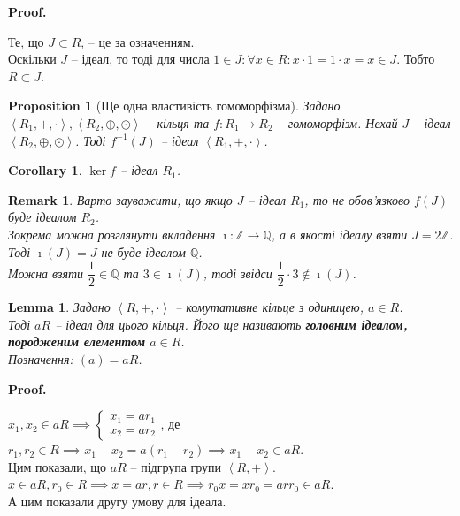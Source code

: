 \documentclass[a4paper, 10pt]{article}
\makeatletter
\theoremstyle{theoremdd}
\theoremstyle{theoremdd}
\theoremstyle{theoremdd}
\theoremstyle{theoremdd}
\theoremstyle{theoremdd}
\theoremstyle{theoremdd}
\theoremstyle{theoremdd}
\theoremstyle{theoremdd}
\theoremstyle{theoremdd}
\newtheorem{proposition}[theorem]{Proposition}
\theoremstyle{theoremdd}
\theoremstyle{theoremdd}
\newtheorem{remark}[theorem]{Remark}
\theoremstyle{theoremdd}
\theoremstyle{theoremdd}
\newtheorem{lemma}[theorem]{Lemma}
\theoremstyle{theoremdd}
\newtheorem{corollary}[theorem]{Corollary}
\theoremstyle{theoremdd}
\renewenvironment{proof}[1][Proof.\\]{\par
\pushQED{\hfill \qed}%
\normalfont \topsep6\p@\@plus6\p@\relax
\trivlist
\item\relax
{\bfseries
#1\@addpunct{.}}\hspace\labelsep\ignorespaces
}{%
\popQED\endtrivlist\@endpefalse
}
\makeatother
\begin{document}
\begin{proof}
Те, що $J \subset R$, -- це за означенням.\\
Оскільки $J$ -- ідеал, то тоді для числа $1 \in J: \forall x \in R: x \cdot 1 = 1 \cdot x = x \in J$. Тобто $R \subset J$.
\end{proof}

\begin{proposition}[Ще одна властивість гомоморфізма]
Задано $\left< R_1, +, \cdot \right>,\left<R_2, \oplus, \odot \right>$ -- кільця та $f \colon R_1 \to R_2$ -- гомоморфізм. Нехай $J$ -- ідеал $\left<R_2, \oplus, \odot \right>$. Тоді $f^{-1}(J)$ -- ідеал $\left<R_1,+,\cdot\right>$.
\end{proposition}

\begin{corollary}
$\ker f$ -- ідеал $R_1$.
\end{corollary}

\begin{remark}
Варто зауважити, що якщо $J$ -- ідеал $R_1$, то не обов'язково $f(J)$ буде ідеалом $R_2$.\\
Зокрема можна розглянути вкладення $\imath \colon \mathbb{Z} \to \mathbb{Q}$, а в якості ідеалу взяти $J = 2 \mathbb{Z}$. Тоді $\imath(J) = J$ не буде ідеалом $\mathbb{Q}$.\\
Можна взяти $\dfrac{1}{2} \in \mathbb{Q}$ та $3 \in \imath(J)$, тоді звідси $\dfrac{1}{2} \cdot 3 \notin \imath(J)$.
\end{remark}

\begin{lemma}
Задано $\left<R,+,\cdot \right>$ -- комутативне кільце з одиницею, $a \in R$.\\
Тоді $aR$ -- ідеал для цього кільця. Його ще називають \textbf{головним ідеалом, породженим елементом} $a \in R$.\\
Позначення: $(a) = aR$.
\end{lemma}

\begin{proof}
$x_1,x_2 \in aR \implies \begin{cases} x_1 = ar_1 \\ x_2 = ar_2 \end{cases}$, де $r_1,r_2 \in R \implies x_1-x_2 = a(r_1-r_2) \implies x_1-x_2 \in aR$.\\
Цим показали, що $aR$ -- підгрупа групи $\left<R,+ \right>$.\\
$x \in aR,r_0 \in R \implies x = ar, r \in R \implies r_0 x = xr_0 = arr_0 \in aR$.\\
А цим показали другу умову для ідеала.
\end{proof}
\end{document}
